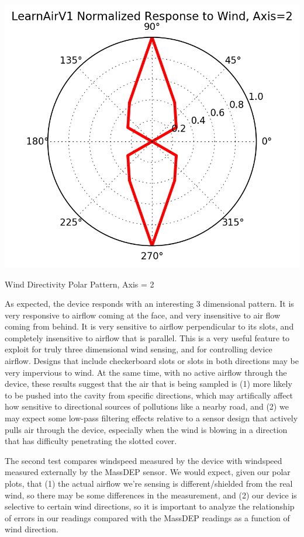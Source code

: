 \begin{marginfigure}
 	\includegraphics[width=\textwidth]{figs/wind_polar_2}               
 	 \caption{Wind Directivity Polar Pattern, Axis = 2}
  	\label{fig:wind_polar_2}
\end{marginfigure}


As expected, the device responds with an interesting 3 dimensional pattern.  It is very responsive to airflow coming at the face, and very insensitive to air flow coming from behind.  It is very sensitive to airflow perpendicular to its slots, and completely insensitive to airflow that is parallel.  This is a very useful feature to exploit for truly three dimensional wind sensing, and for controlling device airflow.  Designs that include checkerboard slots or slots in both directions may be very impervious to wind.  At the same time, with no active airflow through the device, these results suggest that the air that is being sampled is (1) more likely to be pushed into the cavity from specific directions, which may artifically affect how sensitive to directional sources of pollutions like a nearby road, and (2) we may expect some low-pass filtering effects relative to a sensor design that actively pulls air through the device, especially when the wind is blowing in a direction that has difficulty penetrating the slotted cover. 

The second test compares windspeed measured by the device with windspeed measured externally by the MassDEP sensor.  We would expect, given our polar plots, that (1) the actual airflow we're sensing is different/shielded from the real wind, so there may be some differences in the measurement, and (2) our device is selective to certain wind directions, so it is important to analyze the relationship of errors in our readings compared with the MassDEP readings as a function of wind direction. 


